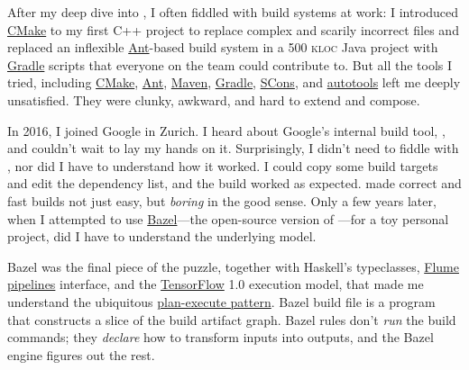 \documentclass{article}
\begin{document}
After my deep dive into , I often fiddled with build systems at work:
I introduced \href{https://cmake.org/}{CMake} to my first C++ project to replace complex and scarily incorrect  files and
replaced an inflexible \href{https://ant.apache.org/}{Ant}-based build system in a 500 \textsc{kloc} Java project with \href{https://gradle.org/}{Gradle} scripts that everyone on the team could contribute to.
But all the tools I tried, including \href{https://cmake.org/}{CMake}, \href{https://ant.apache.org/}{Ant}, \href{https://maven.apache.org/}{Maven}, \href{https://gradle.org/}{Gradle}, \href{https://www.scons.org/}{SCons}, and \href{https://www.gnu.org/software/automake/manual/html_node/Autotools-Introduction.html}{autotools} left me deeply unsatisfied.
They were clunky, awkward, and hard to extend and compose.

In 2016, I joined Google in Zurich.
I heard about Google's internal build tool, , and couldn't wait to lay my hands on it.
Surprisingly, I didn't need to fiddle with , nor did I have to understand how it worked.
I could copy some build targets and edit the dependency list, and the build worked as expected.
 made correct and fast builds not just easy, but \emph{boring} in the good sense.
Only a few years later, when I attempted to use \href{https://bazel.build/}{Bazel}---the open-source version of ---for a toy personal project, did I have to understand the underlying model.

Bazel was the final piece of the puzzle, together with Haskell's typeclasses, \href{https://research.google/pubs/flumejava-easy-efficient-data-parallel-pipelines/}{Flume pipelines} interface,  and the \href{https://www.tensorflow.org/}{TensorFlow} 1.0 execution model, that made me understand the ubiquitous \href{/posts/29-plan-execute.html}{plan-execute pattern}.
Bazel build file is a program that constructs a slice of the build artifact graph.
Bazel rules don't \emph{run} the build commands; they \emph{declare} how to transform inputs into outputs, and the Bazel engine figures out the rest.
\end{document}
